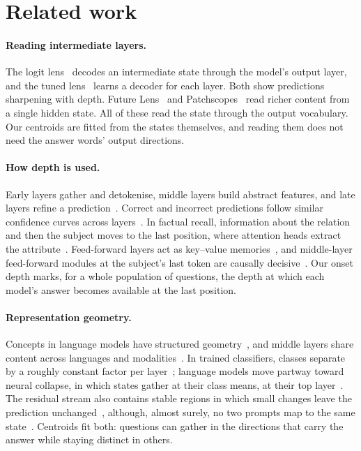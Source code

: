 \section{Related work}
\label{sec:related}

\paragraph{Reading intermediate layers.}
The logit lens~\citep{nostalgebraist2020interpreting} decodes an intermediate state through the model's output layer, and the tuned lens~\citep{belrose2023eliciting} learns a decoder for each layer. Both show predictions sharpening with depth. Future Lens~\citep{pal2023future} and Patchscopes~\citep{ghandeharioun2024patchscopes} read richer content from a single hidden state. All of these read the state through the output vocabulary. Our centroids are fitted from the states themselves, and reading them does not need the answer words' output directions.

\paragraph{How depth is used.}
Early layers gather and detokenise, middle layers build abstract features, and late layers refine a prediction~\citep{lad2024the,csordas2025do,gupta2025how,cheng2024emergence,skean2025layer}. Correct and incorrect predictions follow similar confidence curves across layers~\citep{kim2025on}. In factual recall, information about the relation and then the subject moves to the last position, where attention heads extract the attribute~\citep{geva2023dissecting}. Feed-forward layers act as key--value memories~\citep{geva2020transformer}, and middle-layer feed-forward modules at the subject's last token are causally decisive~\citep{meng2022locating}. Our onset depth marks, for a whole population of questions, the depth at which each model's answer becomes available at the last position.

\paragraph{Representation geometry.}
Concepts in language models have structured geometry~\citep{park2024the,engels2024not,gurnee2023language,gurnee2026when,marks2023the}, and middle layers share content across languages and modalities~\citep{wendler2024do,wu2024the}. In trained classifiers, classes separate by a roughly constant factor per layer~\citep{he2022a}; language models move partway toward neural collapse, in which states gather at their class means, at their top layer~\citep{wu2024linguistic}. The residual stream also contains stable regions in which small changes leave the prediction unchanged~\citep{janiak2024characterizing}, although, almost surely, no two prompts map to the same state~\citep{nikolaou2025language}. Centroids fit both: questions can gather in the directions that carry the answer while staying distinct in others.

